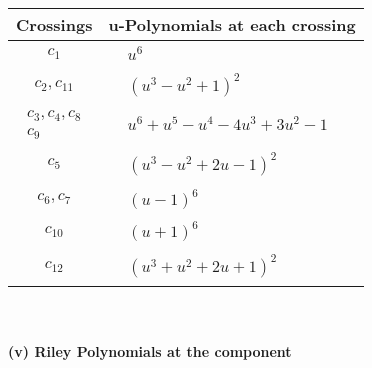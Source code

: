 \documentclass[1p]{elsarticle_modified}
\theoremstyle{definition}
\begin{document}
\begin{tabular}{m{50pt}|m{274pt}}
Crossings & \hspace{64pt}u-Polynomials at each crossing \\
\hline $$\begin{aligned}c_{1}\end{aligned}$$&$\begin{aligned}
&u^6
\end{aligned}$\\
\hline $$\begin{aligned}c_{2},c_{11}\end{aligned}$$&$\begin{aligned}
&(u^3- u^2+1)^2
\end{aligned}$\\
\hline $$\begin{aligned}c_{3},c_{4},c_{8}\\c_{9}\end{aligned}$$&$\begin{aligned}
&u^6+u^5- u^4-4 u^3+3 u^2-1
\end{aligned}$\\
\hline $$\begin{aligned}c_{5}\end{aligned}$$&$\begin{aligned}
&(u^3- u^2+2 u-1)^2
\end{aligned}$\\
\hline $$\begin{aligned}c_{6},c_{7}\end{aligned}$$&$\begin{aligned}
&(u-1)^6
\end{aligned}$\\
\hline $$\begin{aligned}c_{10}\end{aligned}$$&$\begin{aligned}
&(u+1)^6
\end{aligned}$\\
\hline $$\begin{aligned}c_{12}\end{aligned}$$&$\begin{aligned}
&(u^3+u^2+2 u+1)^2
\end{aligned}$\\
\hline
\end{tabular}\\~\\
\newpage\renewcommand{\arraystretch}{1}
\flushleft \textbf{(v) Riley Polynomials at the component}\newline \\
\end{document}
